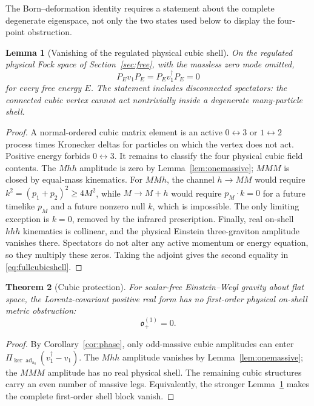 \documentclass[11pt]{article}
\newtheorem{theorem}{Theorem}[section]
\newtheorem{lemma}[theorem]{Lemma}
\theoremstyle{definition}
\theoremstyle{remark}
\newcommand{\dg}{\dagger}
\newcommand{\ad}{\operatorname{ad}}
\newcommand{\ob}{\mathfrak o}
\newcommand{\PiE}{\Pi_{\ker\ad_{h_0}}}
\begin{document}
The Born--deformation identity requires a statement about the complete
degenerate eigenspace, not only the two states used below to display the
four-point obstruction.

\begin{lemma}[Vanishing of the regulated physical cubic shell]
\label{lem:fullcubicshell}
On the regulated physical Fock space of Section~\ref{sec:free}, with the
massless zero mode omitted,
\begin{equation}\label{eq:fullcubicshell}
P_Ev_1P_E=P_Ev_1^{\dg}P_E=0
\end{equation}
for every free energy $E$.  The statement includes disconnected
spectators: the connected cubic vertex cannot act nontrivially inside a
degenerate many-particle shell.
\end{lemma}

\begin{proof}
A normal-ordered cubic matrix element is an active $0\leftrightarrow3$
or $1\leftrightarrow2$ process times Kronecker deltas for particles on
which the vertex does not act.  Positive energy forbids
$0\leftrightarrow3$.  It remains to classify the four physical cubic
field contents.  The $Mhh$ amplitude is zero by
Lemma~\ref{lem:onemassive}; $MMM$ is closed by equal-mass kinematics.
For $MMh$, the channel $h\to MM$ would require
$k^2=(p_1+p_2)^2\ge4M^2$, while $M\to M+h$ would require
$p_M\cdot k=0$ for a future timelike $p_M$ and a future nonzero null
$k$, which is impossible.  The only limiting exception is $k=0$, removed
by the infrared prescription.  Finally, real on-shell $hhh$ kinematics
is collinear, and the physical Einstein three-graviton amplitude
vanishes there.  Spectators do not alter any active momentum or energy
equation, so they multiply these zeros.  Taking the adjoint gives the
second equality in \eqref{eq:fullcubicshell}.
\end{proof}

\begin{theorem}[Cubic protection]\label{thm:cubicprotection}
For scalar-free Einstein--Weyl gravity about flat space, the
Lorentz-covariant positive real form has no first-order physical on-shell
metric obstruction:
\begin{equation}\label{eq:firstzero}
\boxed{\ob_+^{(1)}=0.}
\end{equation}
\end{theorem}

\begin{proof}
By Corollary~\ref{cor:phase}, only odd-massive cubic amplitudes can enter
$\PiE(v_1^{\dg}-v_1)$.  The $Mhh$ amplitude vanishes by
Lemma~\ref{lem:onemassive}; the $MMM$ amplitude has no real physical
shell.  The remaining cubic structures carry an even number of massive
legs.  Equivalently, the stronger Lemma~\ref{lem:fullcubicshell} makes
the complete first-order shell block vanish.
\end{proof}
\end{document}

